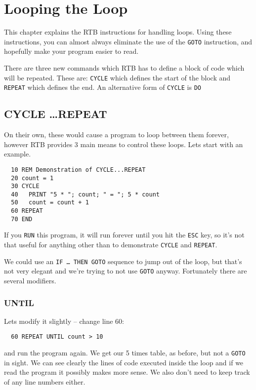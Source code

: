 \chapter{Looping the Loop}

This chapter explains the RTB instructions for handling loops.
Using these instructions, you can almost always eliminate the
use of the {\tt GOTO} instruction, and hopefully make your
program easier to read.

There are three new commands which RTB has to define a block of code which
will be repeated. These are: {\tt CYCLE} which defines
the start of the block and {\tt REPEAT} which defines
the end. An alternative form of {\tt CYCLE} is {\tt DO}

\section{CYCLE \dots REPEAT}

On their own, these would cause a program to loop between them forever,
however RTB provides 3 main means to control these loops. Lets start
with an example.
\begin{verbatim}
  10 REM Demonstration of CYCLE...REPEAT
  20 count = 1
  30 CYCLE
  40   PRINT "5 * "; count; " = "; 5 * count
  50   count = count + 1
  60 REPEAT
  70 END
\end{verbatim}
If you {\tt RUN} this program, it will run forever until you hit the
{\tt ESC} key, so it's not that useful for anything other than to
demonstrate {\tt CYCLE} and {\tt REPEAT}.

We could use an {\tt IF \dots\ THEN GOTO} sequence to jump out of the
loop, but that's not very elegant and we're trying to not use {\tt GOTO}
anyway. Fortunately there are several modifiers.

\subsection{UNTIL}
Lets modify it slightly -- change line 60:
\begin{verbatim}
  60 REPEAT UNTIL count > 10
\end{verbatim}
and run the program again. We get our 5 times table, as before, but not a
{\tt GOTO} in sight. We can see clearly the lines of code executed inside
the loop and if we read the program it possibly makes more sense. We also
don't need to keep track of any line numbers either.

